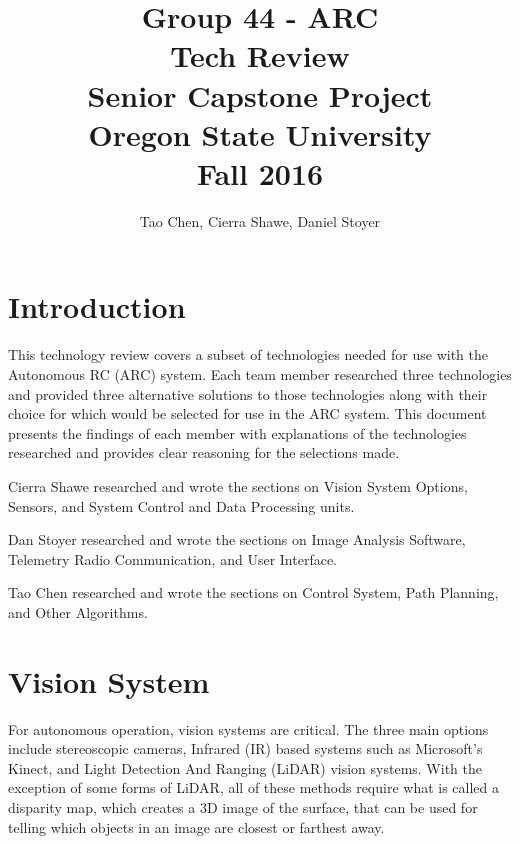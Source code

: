 \documentclass[compsoc,draftclsnofoot,onecolumn,10pt]{IEEEtran}
\begin{document}
\begin{titlepage}
\title{
Group 44 - ARC \\
Tech Review\\
\LARGE
Senior Capstone Project\\
Oregon State University\\
Fall 2016
}

\author{Tao Chen, Cierra Shawe, Daniel Stoyer}
\maketitle



\thispagestyle{empty} %

\end{titlepage}
\newpage

\tableofcontents

\newpage

\section{Introduction}
This technology review covers a subset of technologies needed for use with the
Autonomous RC (ARC) system. Each team member researched three technologies and provided
three alternative solutions to those technologies along with their choice for
which would be selected for use in the ARC system. This document presents the
findings of each member with explanations of the technologies researched and
provides clear reasoning for the selections made.\par
Cierra Shawe researched and wrote the sections on Vision System Options,
Sensors, and System Control and Data Processing units.\par
Dan Stoyer researched and wrote the sections on Image Analysis Software,
Telemetry Radio Communication, and User Interface.\par
Tao Chen researched and wrote the sections on Control System, Path Planning, and
Other Algorithms.\par

\newpage

\section{Vision System} %
For autonomous operation, vision systems are critical. 
The three main options include stereoscopic cameras, Infrared (IR) based systems such as Microsoft's Kinect, and Light Detection And Ranging (LiDAR) vision systems. 
With the exception of some forms of LiDAR, all of these methods require what is called a disparity map, which creates a 3D image of the surface, that can be used for telling which objects in an image are closest or farthest away. 
\end{document}
